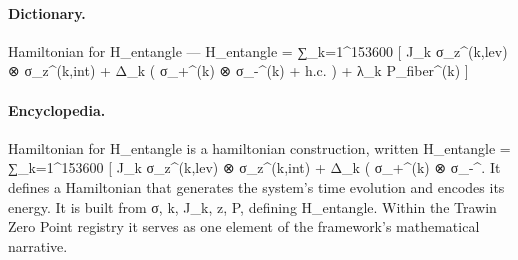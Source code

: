 \paragraph{Dictionary.}
Hamiltonian for H\_entangle — H\_entangle = ∑\_k=1\textasciicircum{}153600 [ J\_k σ\_z\textasciicircum{}(k,lev) ⊗ σ\_z\textasciicircum{}(k,int) + Δ\_k ( σ\_+\textasciicircum{}(k) ⊗ σ\_-\textasciicircum{}(k) + h.c. ) + λ\_k P\_fiber\textasciicircum{}(k) ]

\paragraph{Encyclopedia.}
Hamiltonian for H\_entangle is a hamiltonian construction, written H\_entangle = ∑\_k=1\textasciicircum{}153600 [ J\_k σ\_z\textasciicircum{}(k,lev) ⊗ σ\_z\textasciicircum{}(k,int) + Δ\_k ( σ\_+\textasciicircum{}(k) ⊗ σ\_-\textasciicircum{}. It defines a Hamiltonian that generates the system's time evolution and encodes its energy. It is built from σ, k, J\_k, z, P, defining H\_entangle. Within the Trawin Zero Point registry it serves as one element of the framework's mathematical narrative.
